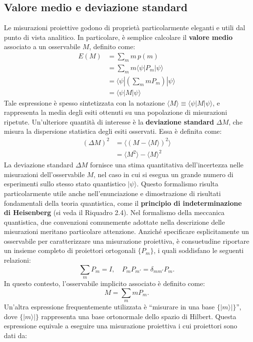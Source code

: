 \documentclass[a4paper,12pt]{report}
\theoremstyle{plain}
\begin{document}
\subsection*{Valore medio e deviazione standard}
Le misurazioni proiettive godono di proprietà particolarmente eleganti e utili dal punto di vista analitico. In particolare, è semplice calcolare il \textbf{valore medio} associato a un osservabile $M$, definito come:
\begin{align}
E(M) &= \sum_m m \, p(m) \\
&= \sum_m m \langle \psi | P_m | \psi \rangle \\
&= \langle \psi | \left( \sum_m m P_m \right) | \psi \rangle \\
&= \langle \psi | M | \psi \rangle
\end{align}
Tale espressione è spesso sintetizzata con la notazione $\langle M \rangle \equiv \langle \psi | M | \psi \rangle$, e rappresenta la media degli esiti ottenuti su una popolazione di misurazioni ripetute.
Un'ulteriore quantità di interesse è la \textbf{deviazione standard} $\Delta M$, che misura la dispersione statistica degli esiti osservati. Essa è definita come:
\begin{align}
(\Delta M)^2 &= \langle (M - \langle M \rangle)^2 \rangle \\
&= \langle M^2 \rangle - \langle M \rangle^2
\end{align}
La deviazione standard $\Delta M$ fornisce una stima quantitativa dell'incertezza nelle misurazioni dell'osservabile $M$, nel caso in cui si esegua un grande numero di esperimenti sullo stesso stato quantistico $|\psi\rangle$. Questo formalismo risulta particolarmente utile anche nell'enunciazione e dimostrazione di risultati fondamentali della teoria quantistica, come il \textbf{principio di indeterminazione di Heisenberg} (si veda il Riquadro 2.4).
Nel formalismo della meccanica quantistica, due convenzioni comunemente adottate nella descrizione delle misurazioni meritano particolare attenzione. Anziché specificare esplicitamente un osservabile per caratterizzare una misurazione proiettiva, è consuetudine riportare un insieme completo di proiettori ortogonali $\{P_m\}$, i quali soddisfano le seguenti relazioni:
\[
\sum_m P_m = I, \quad P_m P_{m'} = \delta_{mm'} P_m.
\]
In questo contesto, l'osservabile implicito associato è definito come:
\[
M = \sum_m m P_m.
\]
Un'altra espressione frequentemente utilizzata è ``misurare in una base $\{|m\rangle|\}$'', dove $\{|m\rangle|\}$ rappresenta una base ortonormale dello spazio di Hilbert. Questa espressione equivale a eseguire una misurazione proiettiva i cui proiettori sono dati da:
\end{document}
